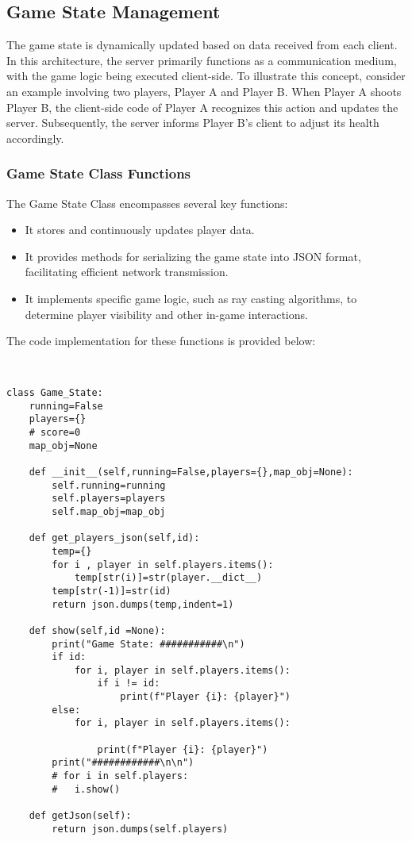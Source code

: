 \subsection{Game State Management}
The game state is dynamically updated based on data received from each client. In this architecture, the server primarily functions as a communication medium, with the game logic being executed client-side. To illustrate this concept, consider an example involving two players, Player A and Player B. When Player A shoots Player B, the client-side code of Player A recognizes this action and updates the server. Subsequently, the server informs Player B's client to adjust its health accordingly.

\subsubsection{Game State Class Functions}
The Game State Class encompasses several key functions:

\begin{itemize}
    \item It stores and continuously updates player data.
    \item It provides methods for serializing the game state into JSON format, facilitating efficient network transmission.
    \item It implements specific game logic, such as ray casting algorithms, to determine player visibility and other in-game interactions.
\end{itemize}

The code implementation for these functions is provided below:
\begin{lstlisting}[style=pythonstyle]

    
class Game_State:
    running=False
    players={}
    # score=0
    map_obj=None

    def __init__(self,running=False,players={},map_obj=None):
        self.running=running
        self.players=players
        self.map_obj=map_obj

    def get_players_json(self,id):
        temp={}
        for i , player in self.players.items():
            temp[str(i)]=str(player.__dict__)
        temp[str(-1)]=str(id)
        return json.dumps(temp,indent=1)
        
    def show(self,id =None):
        print("Game State: ###########\n")
        if id:
            for i, player in self.players.items():
                if i != id:
                    print(f"Player {i}: {player}") 
        else:
            for i, player in self.players.items():
                
                print(f"Player {i}: {player}")
        print("############\n\n")
        # for i in self.players:
        # 	i.show()

    def getJson(self):
        return json.dumps(self.players)
        \end{lstlisting}

